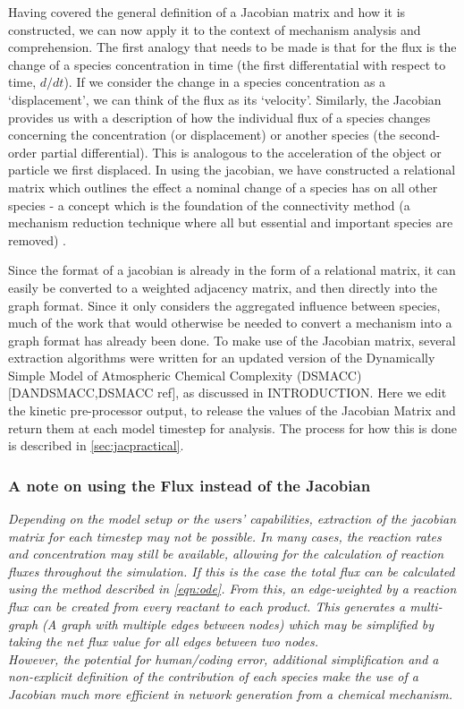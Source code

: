 Having covered the general definition of a Jacobian matrix and how it is constructed, we can now apply it to the context of mechanism analysis and comprehension. The first analogy that needs to be made is that for the flux is the change of a species concentration in time (the first differentatial with respect to time, $d/dt$). If we consider the change in a species concentration as a `displacement', we can think of the flux as its `velocity'.
Similarly, the Jacobian provides us with a description of how the individual flux of a species changes concerning the concentration (or displacement) or another species (the second-order partial differential). This is analogous to the acceleration of the object or particle we first displaced. In using the jacobian, we have constructed a relational matrix which outlines the effect a nominal change of a species has on all other species - a concept which is the foundation of the connectivity method (a mechanism reduction technique where all but essential and important species are removed) \citep{connectivity}.

Since the format of a jacobian is already in the form of a relational matrix, it can easily be converted to a weighted adjacency matrix, and then directly into the graph format. Since it only considers the aggregated influence between species, much of the work that would otherwise be needed to convert a mechanism into a graph format has already been done. To make use of the Jacobian matrix, several extraction algorithms were written for an updated version of the Dynamically Simple Model of Atmospheric Chemical Complexity (DSMACC) [DANDSMACC,DSMACC ref], as discussed in INTRODUCTION. Here we edit the kinetic pre-processor output, \citep{kpp} to release the values of the Jacobian Matrix and return them at each model timestep for analysis. The process for how this is done is described in \autoref{sec:jacpractical}.



\subsubsection*{ A note on using the Flux instead of the Jacobian }
\textit{
Depending on the model setup or the users' capabilities, extraction of the jacobian matrix for each timestep may not be possible. In many cases, the reaction rates and concentration may still be available, allowing for the calculation of reaction fluxes throughout the simulation. If this is the case the total flux can be calculated using the method described in  \autoref{eqn:ode}. From this, an edge-weighted by a reaction flux can be created from every reactant to each product. This generates a multi-graph (A graph with multiple edges between nodes) which may be simplified by taking the net flux value for all edges between two nodes. \\
However, the potential for human/coding error, additional simplification and a non-explicit definition of the contribution of each species make the use of a Jacobian much more efficient in network generation from a chemical mechanism. 
}

